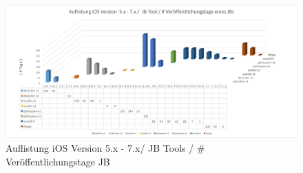 \begin{figure}[htbp!]
        \centering
                \includegraphics[scale=0.45]{Bilder/Frage1_2.png}
        \caption{Auflistung iOS Version 5.x - 7.x/ JB Tools / \newline \# Veröffentlichungstage JB \protect\footnotemark}
        \label{fig:AnalyseiOSJB2}
\end{figure}
\newpage

